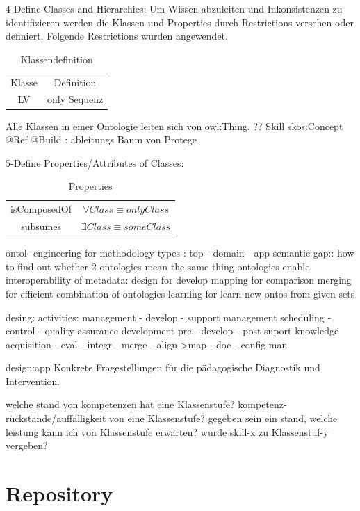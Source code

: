 \documentclass[
12pt,
english,
ngerman,
headsepline,
twoside,
openright,
numbers=noenddot,version=first
]{scrreprt}
\providecommand{\tabularnewline}{\\}
\begin{document}
4-Define Classes and Hierarchies:
Um Wissen abzuleiten und Inkonsistenzen zu identifizieren werden die Klassen und Properties durch Restrictions versehen oder definiert. Folgende Restrictions wurden angewendet.
\begin{table}[H]
\caption{Klassendefinition}

\noindent \centering{}\begin{tabular}{cc}
\hline
\noalign{\vskip\doublerulesep}
Klasse & Definition \tabularnewline[\doublerulesep]
\noalign{\vskip\doublerulesep}
LV & only Sequenz \tabularnewline[\doublerulesep]
\end{tabular}
\end{table}


Alle Klassen in einer Ontologie leiten sich von \glqq owl:Thing\grqq. ??
Skill skos:Concept @Ref
@Build : ableitungs Baum von Protege

5-Define Properties/Attributes of Classes:
\begin{table}[H]
\caption{Properties}

\noindent \centering{}\begin{tabular}{cc}
\hline
\noalign{\vskip\doublerulesep}
isComposedOf & $\forall{Class} \equiv only Class$ \tabularnewline[\doublerulesep]
\noalign{\vskip\doublerulesep}
subsumes & $\exists{Class} \equiv some Class$ \tabularnewline[\doublerulesep]
\end{tabular}
\end{table}


ontol- engineering for methodology
types : top - domain - app
semantic gap:: how to find out whether 2 ontologies mean the same thing
ontologies enable interoperability of metadata:
design for develop
mapping for comparison
merging for efficient combination of ontologies
learning for learn new ontos from given sets

desing:
activities: management - develop - support
management
scheduling - control - quality assurance
development
pre - develop - post
suport
knowledge acquisition - eval - integr - merge - align->map - doc - config man

design:app
Konkrete Fragestellungen für die pädagogische Diagnostik und Intervention.

welche stand von kompetenzen hat eine Klassenstufe?
kompetenz-rückstände/auffälligkeit von eine Klassenstufe?
gegeben sein ein stand, welche leistung kann ich von Klassenstufe erwarten?
wurde skill-x zu Klassenstuf-y vergeben?

\section{Repository}
\end{document}
